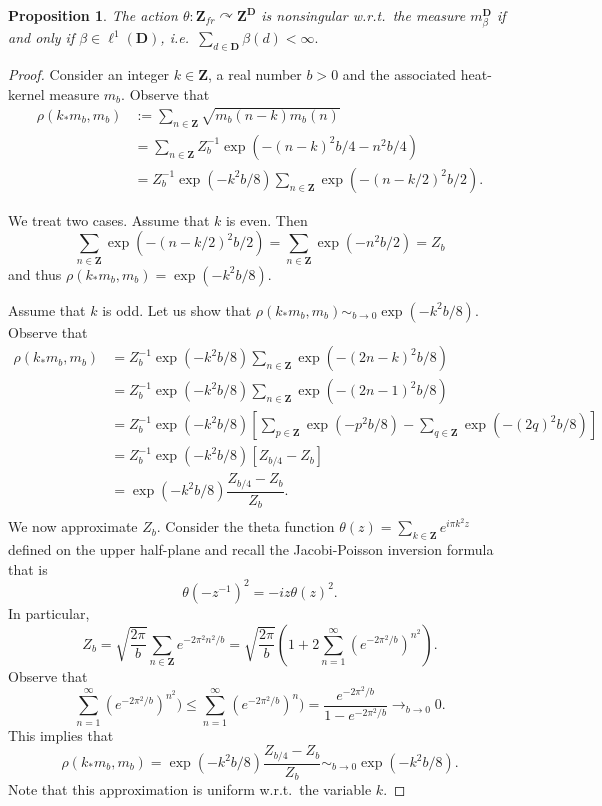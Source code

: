 \documentclass[a4paper,12pt]{amsart}
\numberwithin{equation}{section}
\newtheorem{proposition}[theo]{Proposition}
\theoremstyle{definition}
\newcommand{\act}{\curvearrowright}
\newcommand{\D}{\mathbf D}
\newcommand{\Z}{\mathbf{Z}}
\begin{document}
\begin{proposition}\label{prop:nonsingular}
The action $\theta:\Z_{fr}\act \Z^\D$ is nonsingular w.r.t.~the measure $m^\D_\beta$ if and only if $\beta\in\ell^{1}(\D)$, i.e.~$\sum_{d\in\D}\beta(d)<\infty.$
\end{proposition}
\begin{proof}
Consider an integer $k\in\Z$, a real number $b>0$ and the associated heat-kernel measure $m_b.$ 
Observe that 
\begin{align*}
\rho(k_*m_b, m_b) &:= \sum_{n\in\Z} \sqrt{ m_b(n-k) m_b(n)}\\
& = \sum_{n\in\Z} Z_b^{-1} \exp(-(n-k)^2b/4 - n^2 b/4)\\
& = Z_b^{-1} \exp(-k^2 b/8) \sum_{n\in\Z} \exp( - (n- k/2)^2 b/2).
\end{align*}

We treat two cases.
Assume that $k$ is even.
Then 
$$\sum_{n\in\Z} \exp( - (n-k/2)^2 b/2)=\sum_{n\in\Z} \exp( - n^2 b/2)=Z_b$$ 
and thus $\rho(k_*m_b, m_b)=\exp(-k^2 b/8).$

Assume that $k$ is odd.
Let us show that $\rho(k_*m_b, m_b)\sim_{b\to 0} \exp(-k^2 b/8).$
Observe that 
\begin{align*}
\rho(k_*m_b, m_b) & = Z_b^{-1} \exp(-k^2 b/8) \sum_{n\in\Z} \exp( - (2n-k)^2 b/8)\\
& = Z_b^{-1} \exp(-k^2 b/8) \sum_{n\in\Z} \exp( - (2n-1)^2 b/8)\\
& = Z_b^{-1} \exp(-k^2 b/8) [ \sum_{p\in\Z} \exp( - p^2 b/8) - \sum_{q\in\Z} \exp( - (2q)^2 b/8) ] \\
& = Z_b^{-1} \exp(-k^2 b/8) [ Z_{b/4} - Z_b]\\
& = \exp(-k^2 b/8)\dfrac{ Z_{b/4} - Z_b }{ Z_b }.\\
\end{align*}
We now approximate $Z_b$.
Consider the theta function $\theta(z)=\sum_{k\in\Z} e^{i\pi k^2 z}$ defined on the upper half-plane and recall the Jacobi-Poisson inversion formula that is 
\begin{equation}\label{equa:theta}\theta(-z^{-1})^2 = -iz \theta(z)^2.\end{equation}
In particular, $$Z_b = \sqrt{ \dfrac{2\pi}{b} } \sum_{n\in\Z} e^{-2\pi^2 n^2/b} = \sqrt{ \dfrac{2\pi}{b} } (1+ 2\sum_{n=1}^\infty (e^{-2\pi^2/b})^{n^2} ).$$
Observe that 
$$\sum_{n=1}^\infty (e^{-2\pi^2/b})^{n^2} )\leq \sum_{n=1}^\infty (e^{-2\pi^2/b})^{n} ) = \dfrac{e^{-2\pi^2/b}}{1-e^{-2\pi^2/b}}\to_{b\to 0} 0.$$ 
This implies that 
$$\rho(k_*m_b, m_b) = \exp(-k^2 b/8)\dfrac{ Z_{b/4} - Z_b }{ Z_b } \sim_{b\to 0} \exp(-k^2 b/8).$$
Note that this approximation is uniform w.r.t.~the variable $k$.


\end{proof}
\end{document}
